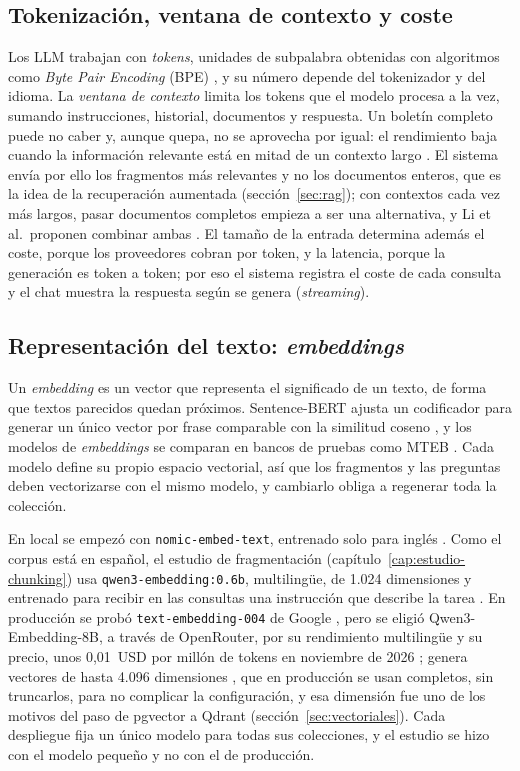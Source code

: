 \subsection{Tokenización, ventana de contexto y coste}
\label{sec:llm-contexto}

Los LLM trabajan con \emph{tokens}, unidades de subpalabra obtenidas con algoritmos como \emph{Byte Pair Encoding} (BPE) \cite{sennrich2016}, y su número depende del tokenizador y del idioma. La \emph{ventana de contexto} limita los tokens que el modelo procesa a la vez, sumando instrucciones, historial, documentos y respuesta. Un boletín completo puede no caber y, aunque quepa, no se aprovecha por igual: el rendimiento baja cuando la información relevante está en mitad de un contexto largo \cite{liu2024lost}. El sistema envía por ello los fragmentos más relevantes y no los documentos enteros, que es la idea de la recuperación aumentada (sección~\ref{sec:rag}); con contextos cada vez más largos, pasar documentos completos empieza a ser una alternativa, y Li et al.\ proponen combinar ambas \cite{li2024ragvslong}. El tamaño de la entrada determina además el coste, porque los proveedores cobran por token, y la latencia, porque la generación es token a token; por eso el sistema registra el coste de cada consulta y el chat muestra la respuesta según se genera (\emph{streaming}).

\subsection{Representación del texto: \emph{embeddings}}
\label{sec:llm-embeddings}

Un \emph{embedding} es un vector que representa el significado de un texto, de forma que textos parecidos quedan próximos. Sentence-BERT ajusta un codificador para generar un único vector por frase comparable con la similitud coseno \cite{reimers2019}, y los modelos de \emph{embeddings} se comparan en bancos de pruebas como MTEB \cite{muennighoff2023}. Cada modelo define su propio espacio vectorial, así que los fragmentos y las preguntas deben vectorizarse con el mismo modelo, y cambiarlo obliga a regenerar toda la colección.

En local se empezó con \texttt{nomic-embed-text}, entrenado solo para inglés \cite{nussbaum2024}. Como el corpus está en español, el estudio de fragmentación (capítulo~\ref{cap:estudio-chunking}) usa \texttt{qwen3-embedding:0.6b}, multilingüe, de 1.024 dimensiones y entrenado para recibir en las consultas una instrucción que describe la tarea \cite{zhang2025qwen3emb}. En producción se probó \texttt{text-embedding-004} de Google \cite{googleembeddings}, pero se eligió Qwen3-Embedding-8B, a través de OpenRouter, por su rendimiento multilingüe y su precio, unos 0,01~USD por millón de tokens en noviembre de 2026 \cite{openrouterqwen3emb}; genera vectores de hasta 4.096 dimensiones \cite{zhang2025qwen3emb,qwen3embcard}, que en producción se usan completos, sin truncarlos, para no complicar la configuración, y esa dimensión fue uno de los motivos del paso de pgvector a Qdrant (sección~\ref{sec:vectoriales}).
Cada despliegue fija un único modelo para todas sus colecciones, y el estudio se hizo con el modelo pequeño y no con el de producción.

